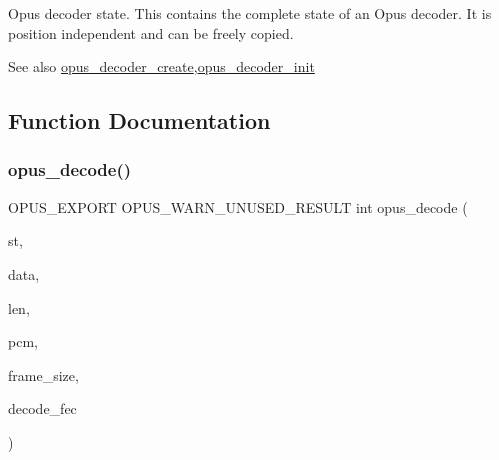 Opus decoder state. This contains the complete state of an Opus decoder. It is position independent and can be freely copied. \begin{DoxySeeAlso}{See also}
\hyperlink{group__opus__decoder_ga6a06f16309dee5883c27223d127c4300}{opus\+\_\+decoder\+\_\+create},\hyperlink{group__opus__decoder_ga40746b48a7b1653987a3a6db2ce3a40b}{opus\+\_\+decoder\+\_\+init} 
\end{DoxySeeAlso}


\subsection{Function Documentation}
\mbox{\label{group__opus__decoder_ga3df1ea406cd9d23a63aed181903d3e5e}} 
\subsubsection{\texorpdfstring{opus\+\_\+decode()}{opus\_decode()}}
{\footnotesize\ttfamily O\+P\+U\+S\+\_\+\+E\+X\+P\+O\+RT O\+P\+U\+S\+\_\+\+W\+A\+R\+N\+\_\+\+U\+N\+U\+S\+E\+D\+\_\+\+R\+E\+S\+U\+LT int opus\+\_\+decode (\begin{DoxyParamCaption}\item[{\hyperlink{group__opus__decoder_ga401d8579958d36094715a6b90cd159a6}{Opus\+Decoder} $\ast$}]{st,  }\item[{\hyperlink{zconf_8h_a2c212835823e3c54a8ab6d95c652660e}{const} unsigned char $\ast$}]{data,  }\item[{\hyperlink{opus__types_8h_aa4d309d6f80b99dbabebc8f98879ab9a}{opus\+\_\+int32}}]{len,  }\item[{\hyperlink{opus__types_8h_acc9ed7cf60479eb81f9648c6ec27dc26}{opus\+\_\+int16} $\ast$}]{pcm,  }\item[{int}]{frame\+\_\+size,  }\item[{int}]{decode\+\_\+fec }\end{DoxyParamCaption})}

